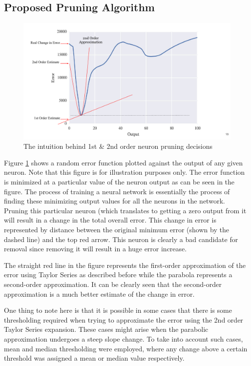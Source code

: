 \subsection{Proposed Pruning Algorithm}
\begin{figure}
  \includegraphics[width=\linewidth]{intuition.pdf}
  \caption{The intuition behind 1st \& 2nd order neuron pruning decisions}
  \label{fig:intuition}
\end{figure}

Figure \ref{fig:intuition} shows a random error function plotted against the output of any given neuron. Note that this figure is for illustration purposes only. The error function is minimized at a particular value of the neuron output as can be seen in the figure. The process of training a neural network is essentially the process of finding these minimizing output values for all the neurons in the network. Pruning this particular neuron (which translates to getting a zero output from it will result in a change in the total overall error. This change in error is represented by distance between the original minimum error (shown by the dashed line) and the top red arrow. This neuron is clearly a bad candidate for removal since removing it will result in a huge error increase. 

The straight red line in the figure represents the first-order approximation of the error using Taylor Series as described before while the parabola represents a second-order approximation. It can be clearly seen that the second-order approximation is a much better estimate of the change in error.

One thing to note here is that it is possible in some cases that there is some thresholding required when trying to approximate the error using the 2nd order Taylor Series expansion. These cases might arise when the parabolic approximation undergoes a steep slope change. To take into account such cases, mean and median thresholding were employed, where any change above a certain threshold was assigned a mean or median value respectively.

